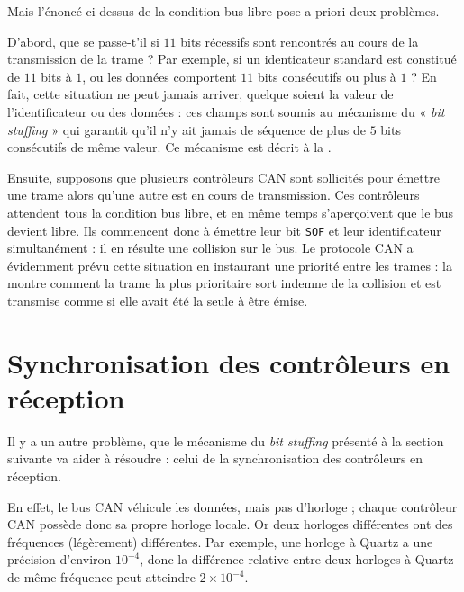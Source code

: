 Mais l'énoncé ci-dessus de la condition bus libre pose a priori deux problèmes.

D'abord, que se passe-t'il si $11$ bits récessifs sont rencontrés au cours de la transmission de la trame ? Par exemple, si un identicateur standard est constitué de $11$ bits à $1$, ou les données comportent $11$ bits consécutifs ou plus à $1$ ? En fait, cette situation ne peut jamais arriver, quelque soient la valeur de l'identificateur ou des données : ces champs sont soumis au mécanisme du « \emph{bit stuffing} » qui garantit qu'il n'y ait jamais de séquence de plus de $5$ bits consécutifs de même valeur. Ce mécanisme est décrit à la .

Ensuite, supposons que plusieurs contrôleurs CAN sont sollicités pour émettre une trame alors qu'une autre est en cours de transmission. Ces contrôleurs attendent tous la condition bus libre, et en même temps s'aperçoivent que le bus devient libre. Ils commencent donc à émettre leur bit \texttt{SOF} et leur identificateur simultanément : il en résulte une collision sur le bus. Le protocole CAN a évidemment prévu cette situation en instaurant une priorité entre les trames : la  montre comment la trame la plus prioritaire sort indemne de la collision et est transmise comme si elle avait été la seule à être émise. 








\section{Synchronisation des contrôleurs en réception}

Il y a un autre problème, que le mécanisme du \emph{bit stuffing} présenté à la section suivante va aider à résoudre : celui de la synchronisation des contrôleurs en réception.

En effet, le bus CAN véhicule les données, mais pas d'horloge ; chaque contrôleur CAN possède donc sa propre horloge locale. Or deux horloges différentes ont des fréquences (légèrement) différentes. Par exemple, une horloge à Quartz a une précision d'environ $10^{-4}$, donc la différence relative entre deux horloges à Quartz de même fréquence peut atteindre $2\times10^{-4}$.











